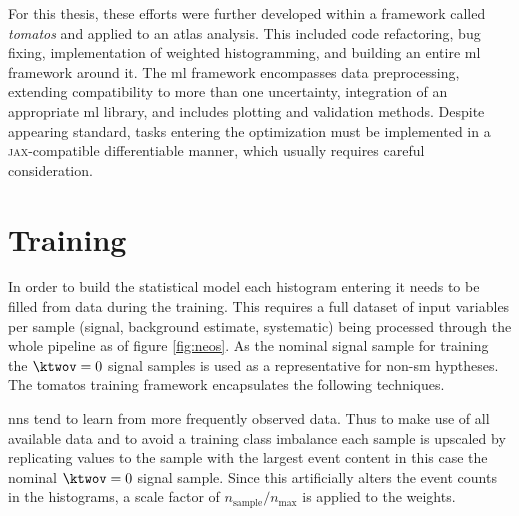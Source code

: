 For this thesis, these efforts were further developed within a framework called \textit{\acf{tomatos}} \citep{tomatos} and applied to an \ac{atlas} analysis. This included code refactoring, bug fixing, implementation of weighted histogramming, and building an entire \ac{ml} framework around it. The \ac{ml} framework encompasses data preprocessing, extending compatibility to more than one uncertainty, integration of an appropriate \ac{ml} library, and includes plotting and validation methods. Despite appearing standard, tasks entering the optimization must be implemented in a \textsc{jax}-compatible differentiable manner, which usually requires careful consideration.


\section{Training}\label{sec:neos_training}
In order to build the statistical model each histogram entering it needs to be filled from data during the training. This requires a full dataset of input variables per sample (signal, background estimate, systematic) being processed through the whole pipeline as of figure \ref{fig:neos}. As the nominal signal sample for training the $\ktwov=0$ signal samples is used as a representative for non-\ac{sm} \ktwov hyptheses. The \ac{tomatos} \citep{tomatos} training framework encapsulates the following techniques.

\acp{nn} tend to learn from more frequently observed data. Thus to make use of all available data and to avoid a training class imbalance each sample is upscaled by replicating values to the sample with the largest event content in this case the nominal $\ktwov=0$ signal sample. Since this artificially alters the event counts in the histograms, a scale factor of $n_\text{sample}/n_\text{max}$ is applied to the weights.

